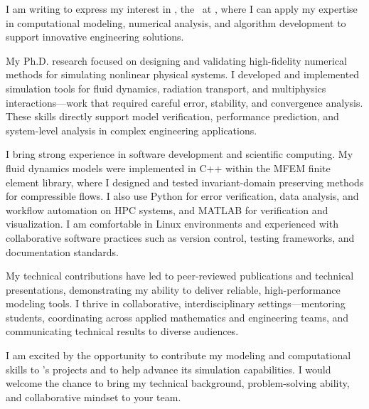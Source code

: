 I am writing to express my interest in 
\ifdefempty{\jobtitle}
  {\company,} %
  {the \jobtitle\ at \company,} %
where I can apply my expertise in computational modeling, numerical analysis, and algorithm development to support innovative engineering solutions.

My Ph.D. research focused on designing and validating high-fidelity numerical methods for simulating nonlinear physical systems. I developed and implemented simulation tools for fluid dynamics, radiation transport, and multiphysics interactions—work that required careful error, stability, and convergence analysis. These skills directly support model verification, performance prediction, and system-level analysis in complex engineering applications.

I bring strong experience in software development and scientific computing. My fluid dynamics models were implemented in C++ within the MFEM finite element library, where I designed and tested invariant-domain preserving methods for compressible flows. I also use Python for error verification, data analysis, and workflow automation on HPC systems, and MATLAB for verification and visualization. I am comfortable in Linux environments and experienced with collaborative software practices such as version control, testing frameworks, and documentation standards.

My technical contributions have led to peer-reviewed publications and technical presentations, demonstrating my ability to deliver reliable, high-performance modeling tools. I thrive in collaborative, interdisciplinary settings—mentoring students, coordinating across applied mathematics and engineering teams, and communicating technical results to diverse audiences.

I am excited by the opportunity to contribute my modeling and computational skills to \company’s projects and to help advance its simulation capabilities. I would welcome the chance to bring my technical background, problem-solving ability, and collaborative mindset to your team.